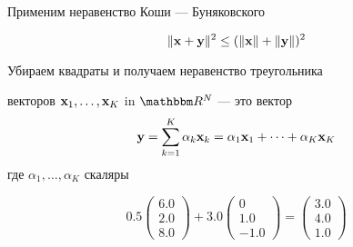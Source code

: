 \begin{frame}
    
     \vspace{2em}
    Применим неравенство Коши — Буняковского
    
    \begin{equation*}
        \| {\mathbf x} + {\mathbf y} \|^2 \leq ( \| {\mathbf x} \| + \| {\mathbf y}\|)^2
    \end{equation*}
    
      \vspace{.7em}
    Убираем квадраты и получаем неравенство треугольника
    
\end{frame}


\begin{frame}
    
    \vspace{2em}
     векторов ${\mathbf x}_1,\ldots, {\mathbf x}_K$ in $\RR^N$ 
    --- это вектор 
    \begin{equation*}
        {\mathbf y} = \sum_{k=1}^K \alpha_k {\mathbf x}_k 
        =  \alpha_1 {\mathbf x}_1 + \cdots +  \alpha_K {\mathbf x}_K 
    \end{equation*}
    где $\alpha_1,\ldots, \alpha_K$ скаляры

    \vspace{.7em}

    \Eg
    
    \begin{equation*}
        0.5 \left(
        \begin{array}{c}
            6.0 \\
            2.0 \\
            8.0
        \end{array}
        \right)
        +
        3.0 \left(
        \begin{array}{c}
             0 \\
             1.0 \\
             -1.0
        \end{array}
        \right)
        =
        \left(
        \begin{array}{c}
            3.0 \\
            4.0 \\
            1.0
        \end{array}
        \right)
    \end{equation*}

\end{frame}

